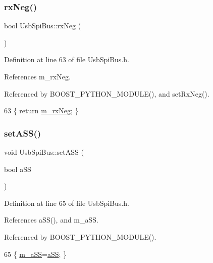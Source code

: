 \subsubsection{\texorpdfstring{rx\+Neg()}{rxNeg()}}
{\footnotesize\ttfamily bool Usb\+Spi\+Bus\+::rx\+Neg (\begin{DoxyParamCaption}{ }\end{DoxyParamCaption})\hspace{0.3cm}{\ttfamily [inline]}}



Definition at line 63 of file Usb\+Spi\+Bus.\+h.



References m\+\_\+rx\+Neg.



Referenced by B\+O\+O\+S\+T\+\_\+\+P\+Y\+T\+H\+O\+N\+\_\+\+M\+O\+D\+U\+L\+E(), and set\+Rx\+Neg().


\begin{DoxyCode}
63 \{ \textcolor{keywordflow}{return} \hyperlink{classUsbSpiBus_abf36f2df24c3ec5363efe73c9771bbc8}{m\_rxNeg}; \}
\end{DoxyCode}
\mbox{\label{classUsbSpiBus_a1a0278c7994ba1fa84919383bd816047}} 
\subsubsection{\texorpdfstring{set\+A\+S\+S()}{setASS()}}
{\footnotesize\ttfamily void Usb\+Spi\+Bus\+::set\+A\+SS (\begin{DoxyParamCaption}\item[{bool}]{a\+SS }\end{DoxyParamCaption})\hspace{0.3cm}{\ttfamily [inline]}}



Definition at line 65 of file Usb\+Spi\+Bus.\+h.



References a\+S\+S(), and m\+\_\+a\+SS.



Referenced by B\+O\+O\+S\+T\+\_\+\+P\+Y\+T\+H\+O\+N\+\_\+\+M\+O\+D\+U\+L\+E().


\begin{DoxyCode}
65 \{ \hyperlink{classUsbSpiBus_ac98d088ac8aed042f65cbd918fc538ae}{m\_aSS}=\hyperlink{classUsbSpiBus_afd9b0823f348dddc7fed8ae97d248e9c}{aSS}; \}
\end{DoxyCode}
\mbox{\label{classUsbSpiBus_a8cd3c808e7b72d8bc0f1d85a774e8c99}} 
